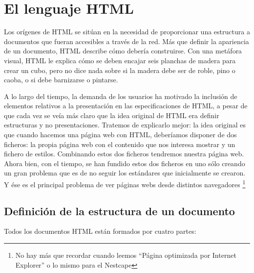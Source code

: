 
\chapter{El lenguaje HTML}
\label{html.tex}
\newcommand{\com}{``}
\newcommand{\elto}[1]{{\tt $<$#1$>$}}

Los orígenes de HTML se sitúan en la necesidad de proporcionar una
estructura a documentos que fueran accesibles a través de la red. Más
que definir la apariencia de un documento, HTML describe cómo debería
construirse. Con una metáfora visual, HTML le explica cómo se deben
encajar seis planchas de madera para crear un cubo, pero no dice nada
sobre si la madera debe ser de roble, pino o caoba, o si debe
barnizarse o pintarse.

A  lo  largo del  tiempo,  la  demanda  de  los usuarios  ha  motivado
la  inclusión  de  elementos  relativos   a  la  presentación  en  las
especificaciones  de  HTML, a  pesar  de  que  cada  vez se  veía  más
claro  que la  idea  original de  HTML era  definir  estructuras y  no
presentaciones. Tratemos de explicarlo mejor:  la idea original es que
cuando hacemos  una página  web con HTML,  deberíamos disponer  de dos
ficheros:  la propia  página web  con  el contenido  que nos  interesa
mostrar  y  un  fichero  de estilos.  Combinando  estos  dos  ficheros
tendremos  nuestra página  web.  Ahora  bien, con  el  tiempo, se  han
fundido estos dos ficheros en uno sólo creando un gran problema que es
de no seguir  los estándares que inicialmente se crearon.  Y ése es el
principal  problema de  ver páginas  webs desde  distintos navegadores
\footnote{No hay  más que  recordar cuando leemos  ``Página optimizada
por Internet Explorer'' o lo mismo para el Nestcape}

\section{Definición de la estructura de un documento}

Todos los documentos HTML están formados por cuatro partes:

